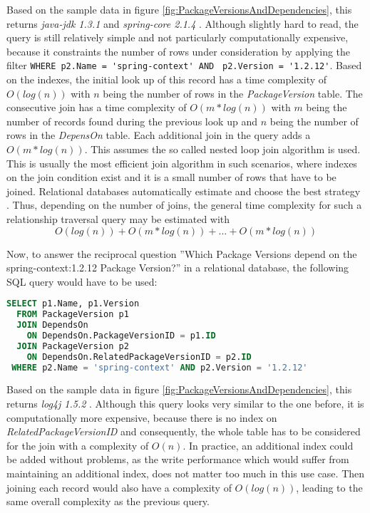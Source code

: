 Based on the sample data in figure \ref{fig:PackageVersionsAndDependencies}, this returns \emph{java-jdk 1.3.1} and \emph{spring-core 2.1.4} \cite{neo4j}. Although slightly hard to read, the query is still relatively simple and not particularly computationally expensive, because it constraints the number of rows under consideration by applying the filter \lstinline|WHERE p2.Name = 'spring-context' AND | \lstinline|p2.Version = '1.2.12'|. Based on the indexes, the initial look up of this record has a time complexity of $O(log(n))$ with $n$ being the number of rows in the \emph{PackageVersion} table. The consecutive join has a time complexity of $O(m*log(n))$ with $m$ being the number of records found during the previous look up and $n$ being the number of rows in the \emph{DepensOn} table. Each additional join in the query adds a $O(m*log(n))$. This assumes the so called nested loop join algorithm is used. This is usually the most efficient join algorithm in such scenarios, where indexes on the join condition exist and it is a small number of rows that have to be joined. Relational databases automatically estimate and choose the best strategy \cite{PostgreSQLJoin}. Thus, depending on the number of joins, the general time complexity for such a relationship traversal query may be estimated with
$$O(log(n)) + O(m*log(n)) + ... + O(m*log(n))$$ 

Now, to answer the reciprocal question ''Which Package Versions depend on the spring-context:1.2.12 Package Version?'' in a relational database, the following SQL query would have to be used:\\

\begin{lstlisting}[language=SQL, caption=SQL Query -- Package Version Reciprocal Dependencies, captionpos=b, label=lst:PackageVersionReciprocalDependencies]
SELECT p1.Name, p1.Version
  FROM PackageVersion p1 
  JOIN DependsOn
    ON DependsOn.PackageVersionID = p1.ID
  JOIN PackageVersion p2
    ON DependsOn.RelatedPackageVersionID = p2.ID
 WHERE p2.Name = 'spring-context' AND p2.Version = '1.2.12'
\end{lstlisting}

Based on the sample data in figure \ref{fig:PackageVersionsAndDependencies}, this returns \emph{log4j 1.5.2} \cite{neo4j}. Although this query looks very similar to the one before, it is computationally more expensive, because there is no index on \emph{RelatedPackageVersionID} and consequently, the whole table has to be considered for the join with a complexity of $O(n)$. In practice, an additional index could be added without problems, as the write performance which would suffer from maintaining an additional index, does not matter too much in this use case. Then joining each record would also have a complexity of $O(log(n))$, leading to the same overall complexity as the previous query.\\

